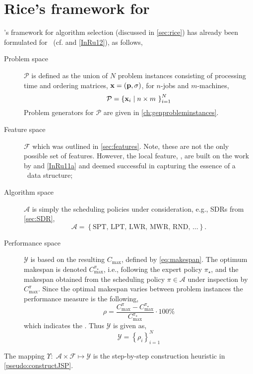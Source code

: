 \section{Rice's framework for \jsp}\label{sec:rice:jsp}
\citeauthor{Rice76}'s framework for algorithm selection (discussed in 
\cref{sec:rice}) has already been formulated for \jsp\ (cf. 
\citet{SmithMilesLion3,SmithMilesLion5} and \cref{InRu12}), as follows, 
\begin{description} 
	\item[Problem space] $\mathcal{P}$ is defined as the union of $N$ problem 
	instances consisting of processing time and ordering matrices, 
	$\mathbf{x}=(\mathbf{p},{\mathbf{\sigma}})$, for $n$-jobs and $m$-machines, 
	\begin{equation} 
		\mathcal{P}=\left\{\mathbf{x}_i\;\middle|\;n\times m~\right\}_{i=1}^{N}
	\end{equation}
	Problem generators for $\mathcal{P}$ are given in \cref{ch:genprobleminstances}.
	\item[Feature space] $\mathcal{F}$ which was outlined in 
	\cref{sec:features}. Note, these are not the only possible set of features. 
	However, the local feature, \phiLocalRelated, are built on the work by 
	\cite{SmithMilesLion3} and \cref{InRu11a} and deemed successful in 
	capturing the essence of a \jsp\ data structure;
	\item[Algorithm space] $\mathcal{A}$ is simply the scheduling policies under consideration, e.g., SDRs from \cref{sec:SDR},
	\begin{equation}
		\mathcal{A}=\left\{\text{SPT,~LPT,~LWR,~MWR,~RND,~}\dotsc\right\}.
	\end{equation} 
	\item[Performance space] $\mathcal{Y}$ is based on the resulting 
	$C_{\max}$, defined by \cref{eq:makespan}. The optimum makespan is denoted 
	$C_{\max}^{\pi_\star}$, i.e., following the expert policy $\pi_\star$, and 
	the makespan obtained from the scheduling policy $\pi\in\mathcal{A}$ under 
	inspection by $C_{\max}^{\pi}$. 
    Since the optimal makespan varies between problem instances the performance 
    measure is the following, 
	\begin{equation}\label{eq:rho}
		\rho=\frac{C_{\max}^{\pi}-C_{\max}^{\pi_\star}}{C_{\max}^{\pi_\star}}\cdot
		 100\%
	\end{equation}
	which indicates the \namerho. Thus $\mathcal{Y}$ is given as, 
	\begin{equation}
		\mathcal{Y}=\left\{\rho_i\right\}_{i=1}^{N}
	\end{equation}
\end{description}
The mapping $\Upsilon:\;\mathcal{A}\times\mathcal{F} \mapsto \mathcal{Y}$ is 
the step-by-step construction heuristic in \cref{pseudo:constructJSP}.